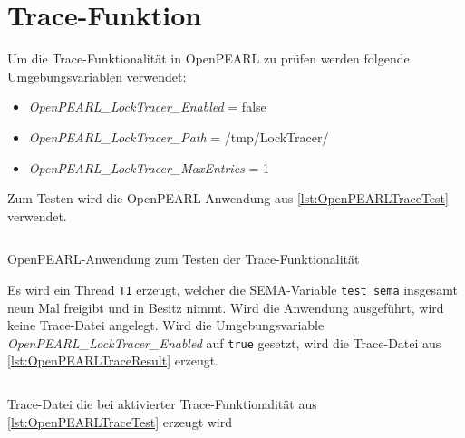 \section{Trace-Funktion}\label{Validierung:Trace-Funktion}
\label{section:ValidierungTraceFunktion}
Um die Trace-Funktionalität in OpenPEARL zu prüfen werden folgende
Umgebungsvariablen verwendet:
\begin{itemize}
  \item \emph{OpenPEARL\-\_LockTracer\-\_Enabled} = false
  \item \emph{OpenPEARL\-\_LockTracer\-\_Path} = /tmp/LockTracer/
  \item \emph{OpenPEARL\-\_LockTracer\-\_MaxEntries} = 1
\end{itemize}
Zum Testen wird die OpenPEARL-Anwendung aus \cref{lst:OpenPEARLTraceTest}
verwendet. 
\begin{listing}[ht]
  \inputminted[frame=lines,linenos]{vim}{./OpenPEARL/TraceTest.prl}
  \caption{OpenPEARL-Anwendung zum Testen der Trace-Funktionalität}
  \label{lst:OpenPEARLTraceTest}
\end{listing}
Es wird ein Thread \texttt{T1} erzeugt, welcher die \textrm{SEMA}-Variable
\texttt{test\_sema} insgesamt neun Mal freigibt und in Besitz nimmt. Wird die
Anwendung ausgeführt, wird keine Trace-Datei angelegt. Wird die
Umgebungsvariable \emph{OpenPEARL\-\_LockTracer\-\_Enabled} auf \texttt{true}
gesetzt, wird die Trace-Datei aus \cref{lst:OpenPEARLTraceResult} erzeugt.
\begin{listing}[ht]
  \begin{minipage}[ht]{\linewidth}
    \begin{multicols}{2}
      \inputminted[linenos]{text}{./OpenPEARL/TraceTestResult.log}
    \end{multicols}
    \caption{Trace-Datei die bei aktivierter Trace-Funktionalität aus \cref{lst:OpenPEARLTraceTest} erzeugt wird}
  \label{lst:OpenPEARLTraceResult}
  \end{minipage}
\end{listing}


